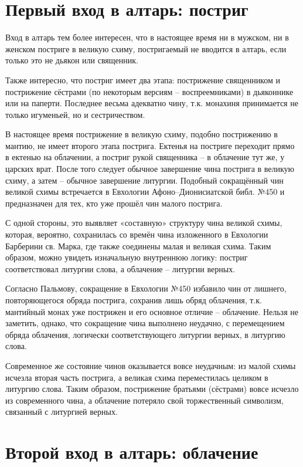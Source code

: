 \section*{Первый вход в алтарь: постриг}\label{ux432ux445ux43eux434-ux432-ux430ux43bux442ux430ux440ux44c-ux43fux43eux441ux442ux440ux438ux433}

Вход в алтарь тем более интересен, что в настоящее время ни в мужском, ни в женском постриге в великую схиму, постригаемый не вводится в алтарь, если только это не дьякон или священник.

Также интересно, что постриг имеет два этапа: пострижение священником и пострижение сёстрами (по некоторым версиям -- воспреемниками) в дьяконнике или на паперти.
Последнее весьма адекватно чину, т.к. монахиня принимается не только игуменьей, но и сестричеством.

В настоящее время пострижение в великую схиму, подобно пострижению в мантию, не имеет второго этапа пострига.
Ектенья на постриге переходит прямо в ектенью на облачении, а постриг рукой священника -- в облачение тут же, у царских врат.
После того следует обычное завершение чина пострига в великую схиму, а затем -- обычное завершение литургии.
Подобный сокращённый чин великой схимы встречается в Евхологии Афоно--Дионисиатской библ. №450 и предназначен для тех, кто уже прошёл чин малого пострига.

С одной стороны, это выявляет «составную» структуру чина великой схимы, которая, вероятно, сохранилась со времён чина изложенного в Евхологии Барберини св. Марка, где также соединены малая и великая схима.
Таким образом, можно увидеть изначальную внутреннюю логику: постриг соответствовал литургии слова, а облачение -- литургии верных.

Согласно Пальмову, сокращение в Евхологии №450 избавило чин от лишнего, повторяющегося обряда пострига, сохранив лишь обряд облачения, т.к. мантийный монах уже пострижен и его основное отличие -- облачение.
Нельзя не заметить, однако, что сокращение чина выполнено неудачно, с перемещением обряда облачения, логически соответствующего литургии верных, в литургию слова.

Современное же состояние чинов оказывается вовсе неудачным: из малой схимы исчезла вторая часть пострига, а великая схима переместилась целиком в литургию слова.
Таким образом, пострижение братьями (сёстрами) вовсе исчезло из современного чина, а облачение потеряло свой торжественный символизм, связанный с литургией верных.

\section*{Второй вход в алтарь: облачение}\label{ux432ux445ux43eux434-ux432-ux430ux43bux442ux430ux440ux44c-ux43eux431ux43bux430ux447ux435ux43dux438ux435}


